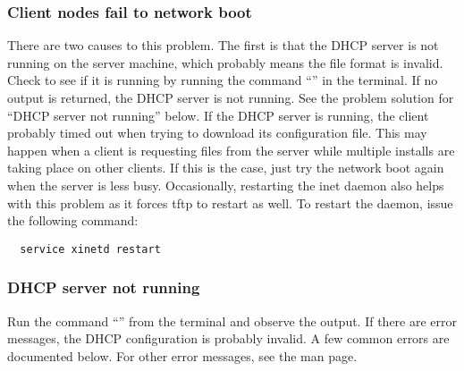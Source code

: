 \subsubsection{Client nodes fail to network boot}
\label{app:troubleshooting-known-problems-dhcp}

There are two causes to this problem. The first is that the DHCP
server is not running on the server machine, which probably means the
 file format is invalid. Check to see if it is
running by running the command ``'' in the
terminal.  If no output is returned, the DHCP server is not running.
See the problem solution for ``DHCP server not running'' below. If the
DHCP server is running, the client probably timed out when trying to
download its configuration file. This may happen when a client is
requesting files from the server while multiple installs are taking
place on other clients. If this is the case, just try the network boot
again when the server is less busy. Occasionally, restarting the inet
daemon also helps with this problem as it forces tftp to restart as
well. To restart the daemon, issue the following command:

\begin{verbatim}
  service xinetd restart
\end{verbatim}

\subsubsection{DHCP server not running}

Run the command ``'' from the terminal and
observe the output. If there are error messages, the DHCP
configuration is probably invalid. A few common errors are documented
below. For other error messages, see the  man page.

